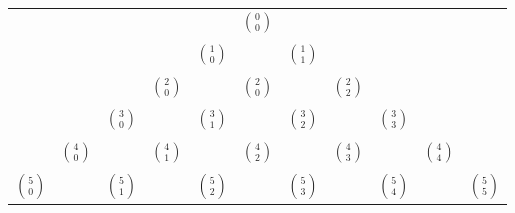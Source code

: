 \begin{center}
\begin{tabular}{c c c c c c c c c c c}
               &               &               &               &               & $0 \choose 0$ &               &               &               &               &               \\
               &               &               &               &               &               &               &               &               &               &               \\
               &               &               &               & $1 \choose 0$ &               & $1 \choose 1$ &               &               &               &               \\
               &               &               &               &               &               &               &               &               &               &               \\
               &               &               & $2 \choose 0$ &               & $2 \choose 0$ &               & $2 \choose 2$ &               &               &               \\
               &               &               &               &               &               &               &               &               &               &               \\
               &               & $3 \choose 0$ &               & $3 \choose 1$ &               & $3 \choose 2$ &               & $3 \choose 3$ &               &               \\
               &               &               &               &               &               &               &               &               &               &               \\
               & $4 \choose 0$ &               & $4 \choose 1$ &               & $4 \choose 2$ &               & $4 \choose 3$ &               & $4 \choose 4$ &               \\
               &               &               &               &               &               &               &               &               &               &               \\
 $5 \choose 0$ &               & $5 \choose 1$ &               & $5 \choose 2$ &               & $5 \choose 3$ &               & $5 \choose 4$ &               & $5 \choose 5$ \\
\end{tabular}
\end{center}

